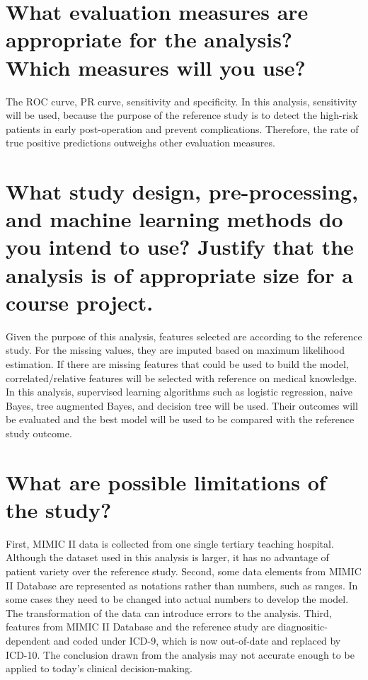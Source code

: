 \documentclass[twoside,10.5pt]{article}
\begin{document}
\section{What evaluation measures are appropriate for the analysis? Which measures will you use?}

The ROC curve, PR curve, sensitivity and specificity. In this analysis, sensitivity will be used, because the purpose of the reference study is to detect the high-risk patients in early post-operation and prevent complications. Therefore, the rate of true positive predictions outweighs other evaluation measures.

\section{What study design, pre-processing, and machine learning methods do you intend to use? Justify that the analysis is of appropriate size for a course project.}

Given the purpose of this analysis, features selected are according to the reference study. For the missing values, they are imputed based on maximum likelihood estimation. If there are missing features that could be used to build the model, correlated/relative features will be selected with reference on medical knowledge. In this analysis, supervised learning algorithms such as logistic regression, naive Bayes, tree augmented Bayes, and decision tree will be used. Their outcomes will be evaluated and the best model will be used to be compared with the reference study outcome.

\section{What are possible limitations of the study?}

First, MIMIC II data is collected from one single tertiary teaching hospital. Although the dataset used in this analysis is larger, it has no advantage of patient variety over the reference study. Second, some data elements from MIMIC II Database are represented as notations rather than numbers, such as ranges. In some cases they need to be changed into actual numbers to develop the model. The transformation of the data can introduce errors to the analysis. Third, features from MIMIC II Database and the reference study are diagnositic-dependent and coded under ICD-9, which is now out-of-date and replaced by ICD-10. The conclusion drawn from the analysis may not accurate enough to be applied to today's clinical decision-making.
\end{document}
